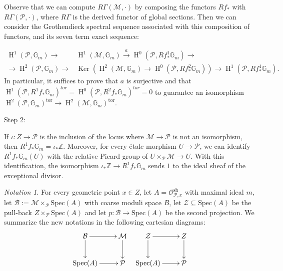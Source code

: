 \documentclass[11pt]{amsart}
\theoremstyle{definition}
\theoremstyle{remark}
\newtheorem{notation}{Notation}
\newcommand{\calO}{\mathcal O}
\newcommand{\calM}{\mathcal M}
\newcommand{\calB}{\mathcal B}
\newcommand{\calP}{\mathcal P}
\newcommand{\calZ}{\mathcal Z}
\newcommand{\bG}{\mathbb{G}}
\newcommand{\Spec}{\mathrm{Spec}}
\newcommand{\oH}{\operatorname{H}}
\begin{document}
Observe that we can compute $R\Gamma(\calM,\cdot)$ by composing the functors $Rf_*$ with $R\Gamma(\calP,\cdot)$, where $R\Gamma$ is the derived functor of global sections. Then we can consider the Grothendieck spectral sequence associated with this composition of functors, and its seven term exact sequence:

\begin{align*}
\oH^1(\calP, \bG_m) \to &\oH^1(\calM, \bG_m) \xrightarrow{a} \oH^0(\calP, Rf_*^1\bG_m) \to \\\to \oH^2(\calP, \bG_m)\to &\operatorname{Ker}(\oH^2(\calM, \bG_m)\to \oH^0(\calP, Rf_*^2\bG_m))\to\oH^1(\calP, Rf_*^1\bG_m).
\end{align*}
In particular, it suffices to prove that $a$ is surjective and that $\oH^1(\calP, R^1f_*\bG_m)^{tor} = \oH^0(\calP, R^2f_*\bG_m)^{tor} = 0$ to guarantee an isomorphism $\oH^2(\calP, \bG_m)^{\text{tor}} \to \oH^2(\calM, \bG_m)^{\text{tor}} $.


\begin{bf}Step 2:\end{bf} If $\iota:Z\to \calP$ is the inclusion of the locus where $\calM\to \calP$ is not an isomorphism, then $R^1f_*\bG_m = \iota_* \mathbb{Z}$. Moreover, for every \'etale morphism $U\to \calP$, we can identify $R^1f_*\bG_m(U)$ with the relative Picard group of $U\times_\calP \calM\to U$. With this identification, the isomorphism $\iota_*\mathbb{Z}\to R^1f_*\bG_m$ sends $1$ to the ideal sheaf of the exceptional divisor. 
\begin{notation} For every geometric point $x\in Z$,
let $A=\calO_{\calP,x}^{\operatorname{sh}}$ with maximal ideal $m$, let $\calB:=\calM\times_{\calP}\Spec(A)$ with coarse moduli space $B$, let $\calZ\subseteq \Spec(A)$ be the pull-back $Z\times_\calP \Spec(A)$ and let $p:\calB\to \Spec(A)$ be the second projection. We summarize the new notations in the following cartesian diagrams:
$$\xymatrix{\calB \ar[d]\ar[r] & \calM \ar[d] \\ \Spec(A)\ar[r] & \calP}\text{ } \text{ } \xymatrix{\calZ \ar[d]\ar[r] & Z \ar[d] \\ \Spec(A)\ar[r] & \calP}$$
\end{notation}
\end{document}
